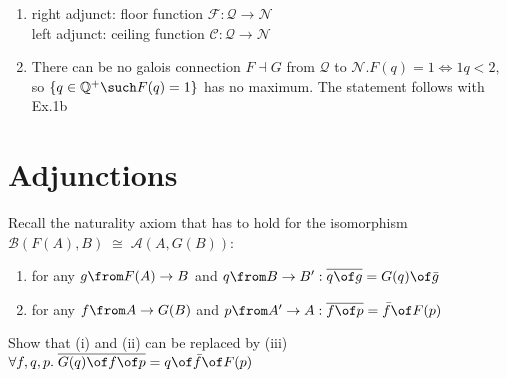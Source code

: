 \begin{answer}
\begin{enumerate} \item right adjunct: floor function  $\mathcal{F} : \mathcal{Q} \to  \mathcal{N}$ \\
left adjunct: ceiling function $\mathcal{C} : \mathcal{Q} \to  \mathcal{N}$
\item There can be no galois connection $F \dashv G$ from $\mathscr{Q}$ to $\mathscr{N} . F(q)=1 \Leftrightarrow 1 q<2,$ so $\{q\in \mathbb{Q}^+ \such F(q) = 1\} $ has no maximum. The statement follows with Ex.1b
\end{enumerate}\end{answer}


\section{Adjunctions}
\begin{exercise}
Recall the naturality axiom that has to hold for the isomorphism $\mathscr{B}(F(A), B) \; \cong \; \mathscr{A}(A, G(B)) $:

\begin{enumerate}[label=(\roman*)]
\item for any $g \from F(A) \to B$ and $q \from B \to B': \overline{q \of g} = G(q) \of \bar{g} $
\item for any $f \from A \to G(B) $ and $ p \from A' \to A: \overline{f \of p} = \bar{f} \of F(p)$
\end{enumerate}
Show that (i) and (ii) can be replaced by (iii) $\forall f, q, p. \;\overline{G(q) \of f \of p} = q \of \bar{f} \of F(p)$
\end{exercise}

